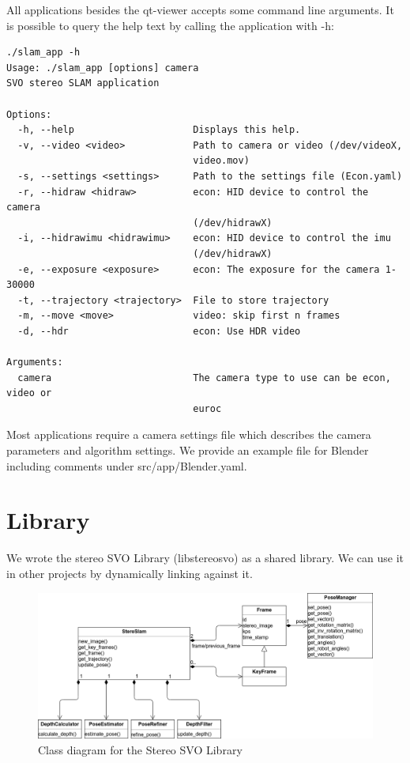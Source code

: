\documentclass[11pt,a4paper,titlepage,oneside]{report}
\begin{document}
All applications besides the qt-viewer accepts some command line arguments. It is possible to query the help text by calling the application with -h:\\
\begin{lstlisting}
./slam_app -h
Usage: ./slam_app [options] camera
SVO stereo SLAM application

Options:
  -h, --help                     Displays this help.
  -v, --video <video>            Path to camera or video (/dev/videoX,
                                 video.mov)
  -s, --settings <settings>      Path to the settings file (Econ.yaml)
  -r, --hidraw <hidraw>          econ: HID device to control the camera
                                 (/dev/hidrawX)
  -i, --hidrawimu <hidrawimu>    econ: HID device to control the imu
                                 (/dev/hidrawX)
  -e, --exposure <exposure>      econ: The exposure for the camera 1-30000
  -t, --trajectory <trajectory>  File to store trajectory
  -m, --move <move>              video: skip first n frames
  -d, --hdr                      econ: Use HDR video

Arguments:
  camera                         The camera type to use can be econ, video or
                                 euroc
\end{lstlisting}

Most applications require a camera settings file which describes the camera parameters and algorithm settings. We provide an example file for Blender including comments under src/app/Blender.yaml.

\section{Library}

We wrote the stereo SVO Library (libstereosvo) as a shared library. We can use it in other projects by dynamically linking against it.
\begin{figure}[H]
  \centering
  \includegraphics[width=1.0\textwidth]{img/class_diagram.png}
  \caption{Class diagram for the Stereo SVO Library}\label{fig:class_diagram}
\end{figure}
\end{document}
